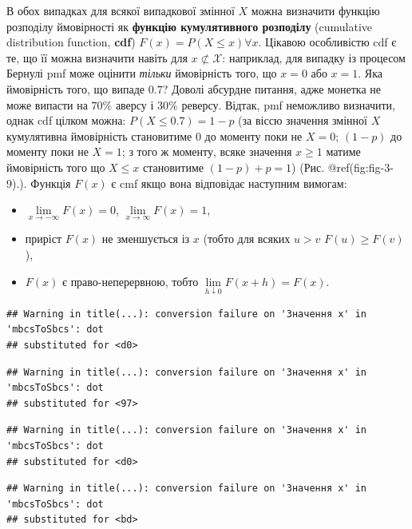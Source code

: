\documentclass[
  11pt,
]{book}
\begin{document}
В обох випадках для всякої випадкової змінної \(X\) можна визначити
функцію розподілу ймовірності як \textbf{функцію кумулятивного
розподілу} (cumulative distribution function, \textbf{cdf})
\(F(x) = P(X \leq x) \forall x\). Цікавою особливістю cdf є те, що її
можна визначити навіть для \(x \not\subset \mathcal{X}\): наприклад, для
випадку із процесом Бернулі pmf може оцінити \emph{тільки} ймовірність
того, що \(x = 0\) або \(x = 1\). Яка ймовірність того, що випаде
\(0.7\)? Доволі абсурдне питання, адже монетка не може випасти на
\(70\%\) аверсу і \(30\%\) реверсу. Відтак, pmf неможливо визначити,
однак cdf цілком можна: \(P (X \leq 0.7) = 1-p\) (за віссю значення
змінної \(X\) кумулятивна ймовірність становитиме \(0\) до моменту поки
не \(X = 0\); \((1-p)\) до моменту поки не \(X = 1\); з того ж моменту,
всяке значення \(x \geq 1\) матиме ймовірність того що \(X \leq x\)
становитиме \((1 - p) + p = 1\)) (Рис. @ref(fig:fig-3-9).). Функція
\(F(x)\) є cmf якщо вона відповідає наступним вимогам:

\begin{itemize}
\item
  \(\lim \limits_{x \rightarrow - \infty} F(x) = 0\),
  \(\lim \limits_{x \rightarrow  \infty} F(x) = 1\),
\item
  приріст \(F(x)\) не зменшується із \(x\) (тобто для всяких \(u > v\)
  \(F(u) \geq F(v)\)),
\item
  \(F(x)\) є право-неперервною, тобто
  \(\lim \limits_{h \downarrow 0} F(x + h) = F(x)\).
\end{itemize}

\begin{verbatim}
## Warning in title(...): conversion failure on 'Значення x' in 'mbcsToSbcs': dot
## substituted for <d0>
\end{verbatim}

\begin{verbatim}
## Warning in title(...): conversion failure on 'Значення x' in 'mbcsToSbcs': dot
## substituted for <97>
\end{verbatim}

\begin{verbatim}
## Warning in title(...): conversion failure on 'Значення x' in 'mbcsToSbcs': dot
## substituted for <d0>
\end{verbatim}

\begin{verbatim}
## Warning in title(...): conversion failure on 'Значення x' in 'mbcsToSbcs': dot
## substituted for <bd>
\end{verbatim}
\end{document}
